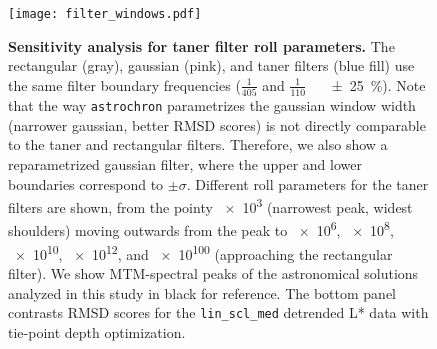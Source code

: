 \documentclass[draft]{agujournal2019}
\begin{document}
\begin{figure}[htb]
  \centering \texttt{[image: filter\_windows.pdf]}
  \caption{\label{fig:filter-windows}
    \textbf{Sensitivity analysis for taner filter roll parameters.}
    The rectangular (gray), gaussian (pink), and taner filters (blue fill)
    use the same filter boundary frequencies (\(\frac{1}{405}\) and \(\frac{1}{110}\)~\si[per-mode=power]{\per\kiloyear} \qty{\pm25}{\percent}).
    Note that the way \texttt{astrochron} parametrizes the gaussian window width (narrower gaussian, better RMSD scores) is not directly comparable to the taner and rectangular filters.
    Therefore, we also show a reparametrized gaussian filter, where the upper and lower boundaries correspond to \(\pm\sigma\).
    Different roll parameters for the taner filters are shown,
    from the pointy \num{e3} (narrowest peak, widest shoulders) moving outwards from the peak to
    \num{e6}, \num{e8}, \num{e10}, \num{e12}, and \num{e100} (approaching the rectangular filter).
    We show MTM-spectral peaks of the astronomical solutions analyzed in this study in black for reference.
    The bottom panel contrasts \gls{RMSD} scores for the \texttt{lin\_scl\_med} detrended \gls{L*} data with tie-point depth optimization.
    }
\end{figure}


\end{document}
